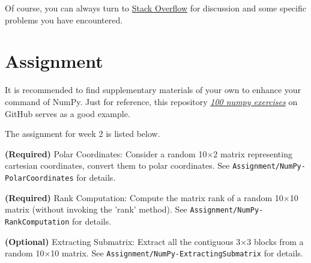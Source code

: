 \documentclass[english]{../TeXTemplate/pkupaper}
\begin{document}
Of course, you can always turn to \href{https://stackoverflow.com/}{Stack Overflow} for discussion and some specific problems you have encountered.

\section{Assignment}

It is recommended to find supplementary materials of your own to enhance your command of NumPy. Just for reference, this repository \href{https://github.com/rougier/numpy-100}{\emph{100 numpy exercises}} on GitHub serves as a good example.

The assignment for week 2 is listed below.

\begin{partlist}
\item \textbf{(Required)} Polar Coordinates: Consider a random 10$\times $2 matrix representing cartesian coordinates, convert them to polar coordinates. See \verb"Assignment/NumPy-PolarCoordinates" for details.
\item \textbf{(Required)} Rank Computation: Compute the matrix rank of a random 10$\times $10 matrix (without invoking the 'rank' method). See \verb"Assignment/NumPy-RankComputation" for details.
\item \textbf{(Optional)} Extracting Submatrix: Extract all the contiguous 3$\times $3 blocks from a random 10$\times $10 matrix. See \verb"Assignment/NumPy-ExtractingSubmatrix" for details.
\end{partlist}
\end{document}
